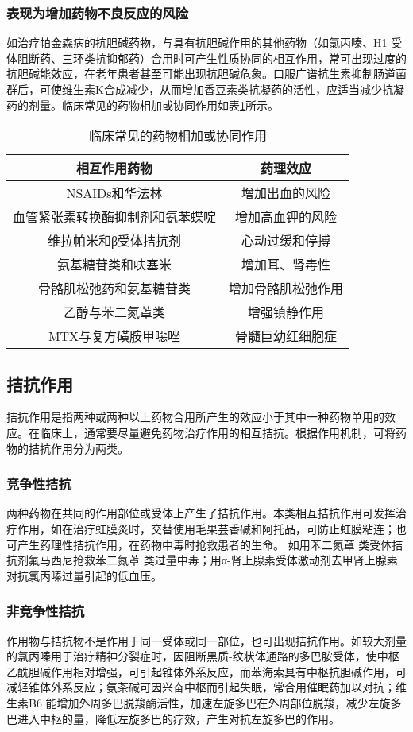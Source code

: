 \subsubsection{表现为增加药物不良反应的风险}

如治疗帕金森病的抗胆碱药物，与具有抗胆碱作用的其他药物（如氯丙嗪、H{1}
受体阻断药、三环类抗抑郁药）合用时可产生性质协同的相互作用，常可出现过度的抗胆碱能效应，在老年患者甚至可能出现抗胆碱危象。口服广谱抗生素抑制肠道菌群后，可使维生素K合成减少，从而增加香豆素类抗凝药的活性，应适当减少抗凝药的剂量。临床常见的药物相加或协同作用如表\ref{tab4-4}所示。

\begin{longtable}{cc}
    \caption{临床常见的药物相加或协同作用}
    \label{tab4-4}\\
\toprule
\endhead
相互作用药物 & 药理效应\tabularnewline
\midrule
NSAIDs和华法林 & 增加出血的风险\tabularnewline
血管紧张素转换酶抑制剂和氨苯蝶啶 & 增加高血钾的风险\tabularnewline
维拉帕米和β受体拮抗剂 & 心动过缓和停搏\tabularnewline
氨基糖苷类和呋塞米 & 增加耳、肾毒性\tabularnewline
骨骼肌松弛药和氨基糖苷类 & 增加骨骼肌松弛作用\tabularnewline
乙醇与苯二氮䓬类 &
增强镇静作用\tabularnewline
MTX与复方磺胺甲噁唑 & 骨髓巨幼红细胞症\tabularnewline
\bottomrule
\end{longtable}

\subsection{拮抗作用}

拮抗作用是指两种或两种以上药物合用所产生的效应小于其中一种药物单用的效应。在临床上，通常要尽量避免药物治疗作用的相互拮抗。根据作用机制，可将药物的拮抗作用分为两类。

\subsubsection{竞争性拮抗}

两种药物在共同的作用部位或受体上产生了拮抗作用。本类相互拮抗作用可发挥治疗作用，如在治疗虹膜炎时，交替使用毛果芸香碱和阿托品，可防止虹膜粘连；也可产生药理性拮抗作用，在药物中毒时抢救患者的生命。
如用苯二氮䓬
类受体拮抗剂氟马西尼抢救苯二氮䓬
类过量中毒；用α-肾上腺素受体激动剂去甲肾上腺素对抗氯丙嗪过量引起的低血压。

\subsubsection{非竞争性拮抗}

作用物与拮抗物不是作用于同一受体或同一部位，也可出现拮抗作用。如较大剂量的氯丙嗪用于治疗精神分裂症时，因阻断黑质-纹状体通路的多巴胺受体，使中枢乙酰胆碱作用相对增强，可引起锥体外系反应，而苯海索具有中枢抗胆碱作用，可减轻锥体外系反应；氨茶碱可因兴奋中枢而引起失眠，常合用催眠药加以对抗；维生素B{6}
能增加外周多巴脱羧酶活性，加速左旋多巴在外周部位脱羧，减少左旋多巴进入中枢的量，降低左旋多巴的疗效，产生对抗左旋多巴的作用。

